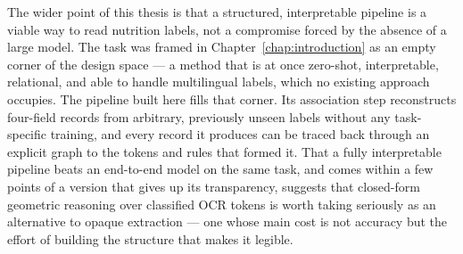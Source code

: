 The wider point of this thesis is that a structured, interpretable pipeline is a
viable way to read nutrition labels, not a compromise forced by the absence of a
large model. The task was framed in Chapter~\ref{chap:introduction} as an empty
corner of the design space --- a method that is at once zero-shot, interpretable,
relational, and able to handle multilingual labels, which no existing approach
occupies. The pipeline built here fills that corner. Its association step
reconstructs four-field records from arbitrary, previously unseen labels without
any task-specific training, and every record it produces can be traced back
through an explicit graph to the tokens and rules that formed it. That a fully
interpretable pipeline beats an end-to-end model on the same task, and comes
within a few points of a version that gives up its transparency, suggests that
closed-form geometric reasoning over classified OCR tokens is worth taking
seriously as an alternative to opaque extraction --- one whose main cost is not
accuracy but the effort of building the structure that makes it legible.
